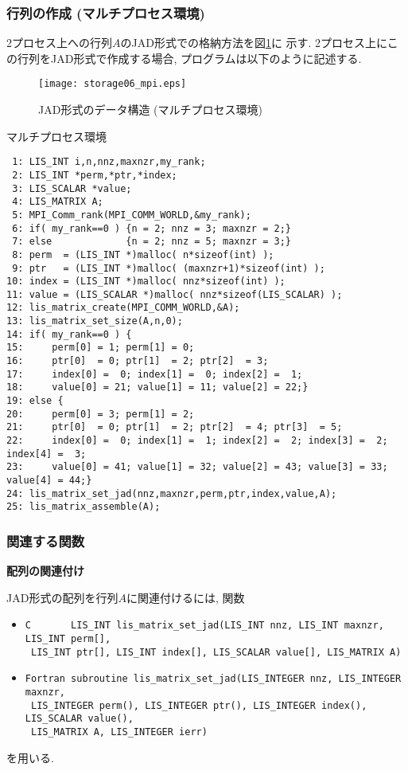 \documentclass[a4paper]{jarticle}
\begin{document}
{{\subsubsection{行列の作成 (マルチプロセス環境)}
2プロセス上への行列$A$のJAD形式での格納方法を図\ref{fig:storage06_mpi}に
示す. 
2プロセス上にこの行列をJAD形式で作成する場合, プログラムは以下のように記述する. 
\begin{figure}[h]
{\centering 
\texttt{[image: storage06\_mpi.eps]} 
\caption{JAD形式のデータ構造 (マルチプロセス環境)}\label{fig:storage06_mpi}}
\end{figure}
\begin{itembox}[l]{マルチプロセス環境}
\small
\begin{verbatim}
 1: LIS_INT i,n,nnz,maxnzr,my_rank;
 2: LIS_INT *perm,*ptr,*index;
 3: LIS_SCALAR *value;
 4: LIS_MATRIX A;
 5: MPI_Comm_rank(MPI_COMM_WORLD,&my_rank);
 6: if( my_rank==0 ) {n = 2; nnz = 3; maxnzr = 2;}
 7: else             {n = 2; nnz = 5; maxnzr = 3;}
 8: perm  = (LIS_INT *)malloc( n*sizeof(int) );
 9: ptr   = (LIS_INT *)malloc( (maxnzr+1)*sizeof(int) );
10: index = (LIS_INT *)malloc( nnz*sizeof(int) );
11: value = (LIS_SCALAR *)malloc( nnz*sizeof(LIS_SCALAR) );
12: lis_matrix_create(MPI_COMM_WORLD,&A);
13: lis_matrix_set_size(A,n,0);
14: if( my_rank==0 ) {
15:     perm[0] = 1; perm[1] = 0;
16:     ptr[0]  = 0; ptr[1]  = 2; ptr[2]  = 3;
17:     index[0] =  0; index[1] =  0; index[2] =  1;
18:     value[0] = 21; value[1] = 11; value[2] = 22;}
19: else {
20:     perm[0] = 3; perm[1] = 2;
21:     ptr[0]  = 0; ptr[1]  = 2; ptr[2]  = 4; ptr[3]  = 5;
22:     index[0] =  0; index[1] =  1; index[2] =  2; index[3] =  2; index[4] =  3;
23:     value[0] = 41; value[1] = 32; value[2] = 43; value[3] = 33; value[4] = 44;}
24: lis_matrix_set_jad(nnz,maxnzr,perm,ptr,index,value,A);
25: lis_matrix_assemble(A);
\end{verbatim}
\end{itembox}

\subsubsection{関連する関数}
\noindent
{\bf 配列の関連付け}

JAD形式の配列を行列$A$に関連付けるには, 関数
\begin{itemize}
\item \verb|C       LIS_INT lis_matrix_set_jad(LIS_INT nnz, LIS_INT maxnzr, LIS_INT perm[],|\\
      \verb| LIS_INT ptr[], LIS_INT index[], LIS_SCALAR value[], LIS_MATRIX A)|
\item \verb|Fortran subroutine lis_matrix_set_jad(LIS_INTEGER nnz, LIS_INTEGER maxnzr,|\\
      \verb| LIS_INTEGER perm(), LIS_INTEGER ptr(), LIS_INTEGER index(), LIS_SCALAR value(),|\\
      \verb| LIS_MATRIX A, LIS_INTEGER ierr)|
\end{itemize}
を用いる. 

}}
\end{document}

